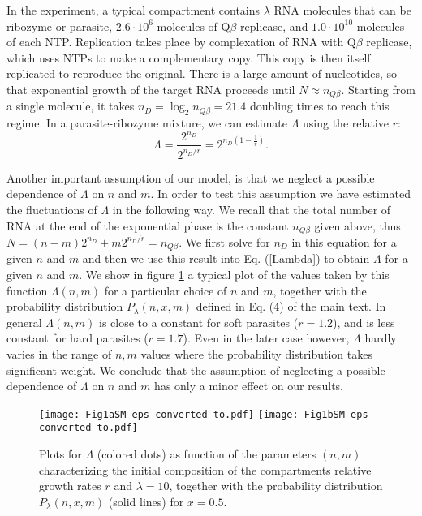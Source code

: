 \documentclass[twocolumn,showpacs,floatfix]{revtex4-1}
\newcommand{\be}{\begin{equation}}
\newcommand{\ee}{\end{equation}}
\begin{document}
\begin{thebibliography}{99}
\begin{widetext}
In the experiment, a typical compartment contains $\lambda$ RNA molecules that can be ribozyme or parasite,
$2.6 \cdot 10^{6}$ molecules of Q$\beta$ replicase, and $1.0 \cdot 10^{10}$ molecules of each NTP. 
Replication takes place by complexation of RNA with Q$\beta$ replicase, which uses NTPs 
to make a complementary copy. This copy is then itself replicated to reproduce the original. 
There is a large amount of nucleotides, so that 
exponential growth of the target RNA proceeds until $N \approx n_{Q \beta}$. 
Starting from a single molecule, it takes $n_{D}=\log_{2} n_{Q \beta} =21.4$ doubling times to 
reach this regime. In a parasite-ribozyme mixture, we can estimate $\Lambda$ using the relative $r$:
\be
\Lambda=\frac{2^{n_D}}{2^{n_D / r }}=2^{n_D (1-\frac{1}{r})}.
\label{Lambda}
\ee


Another important assumption of our model, is that we neglect a possible dependence of $\Lambda$ on $n$ and $m$.
In order to test this assumption we have estimated the fluctuations of $\Lambda$ in the following way.
We recall that the total number of RNA at the end of the exponential phase is the constant $n_{Q\beta}$ given above, thus
$N=(n-m)  2^{n_D} + m 2^{n_D / r }=n_{Q\beta}$.
We first solve for $n_D$ in this equation for a given $n$ and $m$ and then we use this result into Eq. (\ref{Lambda}) to obtain $\Lambda$ for a given $n$ and $m$.
We show in figure \ref{fig:LL} a typical plot of the values taken by this function $\Lambda(n,m)$ for 
a particular choice of $n$ and $m$, together with the probability distribution $P_\lambda(n,x,m)$
defined in Eq. (4) of the main text. In general $\Lambda(n,m)$ is close to a constant for soft parasites ($r=1.2$), and 
is less constant for hard parasites ($r=1.7$). Even in the later case however, 
$\Lambda$ hardly varies in the range of $n,m$ values where the probability distribution 
takes significant weight.
We conclude that the assumption of neglecting a possible dependence of $\Lambda$ on $n$ and $m$ has only 
a minor effect on our results.
\begin{figure}[!htb]
\begin{center}
\texttt{[image: Fig1aSM-eps-converted-to.pdf]}
\texttt{[image: Fig1bSM-eps-converted-to.pdf]}
\end{center}
\caption{Plots for $\Lambda$ (colored dots) as function of the parameters $(n,m)$ characterizing the initial composition 
of the compartments relative growth rates $r$ and $\lambda=10$, together with the probability distribution $P_\lambda(n,x,m)$ (solid lines) for $x=0.5$.
\label{fig:LL}}
\end{figure}




\end{widetext}
\end{thebibliography}
\end{document}
